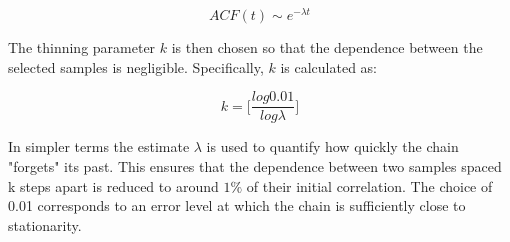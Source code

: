 \documentclass{report}
\begin{document}
$$
ACF(t) \sim e^{-\lambda t}
$$

The thinning parameter $k$ is then chosen so that the dependence between the selected samples is negligible. Specifically, $k$ is calculated as:

$$
k = \biggr[ \frac{log 0.01}{log \lambda} \biggr]
$$

In simpler terms the estimate $\lambda$ is used to quantify how quickly the chain "forgets" its past. This ensures that the dependence between two samples spaced k steps apart is reduced to around $1\%$ of their initial correlation. The choice of 0.01 corresponds to an error level at which the chain is sufficiently close to stationarity.



\begin{figure}[!ht]
	\centering
\end{figure}
\end{document}
